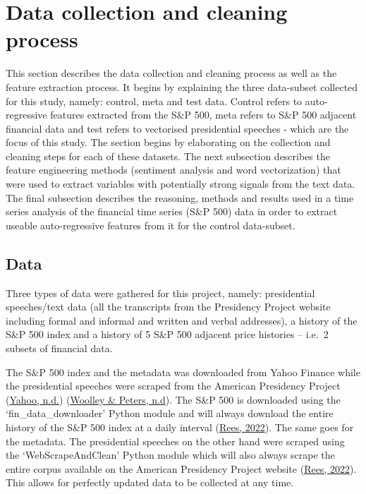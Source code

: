 \documentclass[11pt,preprint, authoryear]{elsarticle}
\numberwithin{equation}{section}
\numberwithin{figure}{section}
\numberwithin{table}{section}
\begin{document}
\hypertarget{data-collection-and-cleaning-process}{%
\section{Data collection and cleaning
process}\label{data-collection-and-cleaning-process}}

This section describes the data collection and cleaning process as well
as the feature extraction process. It begins by explaining the three
data-subset collected for this study, namely: control, meta and test
data. Control refers to auto-regressive features extracted from the S\&P
500, meta refers to S\&P 500 adjacent financial data and test refers to
vectorised presidential speeches - which are the focus of this study.
The section begins by elaborating on the collection and cleaning steps
for each of these datasets. The next subsection describes the feature
engineering methods (sentiment analysis and word vectorization) that
were used to extract variables with potentially strong signals from the
text data. The final subsection describes the reasoning, methods and
results used in a time series analysis of the financial time series
(S\&P 500) data in order to extract useable auto-regressive features
from it for the control data-subset.

\hypertarget{data-1}{%
\subsection{Data}\label{data-1}}

Three types of data were gathered for this project, namely: presidential
speeches/text data (all the transcripts from the Presidency Project
website including formal and informal and written and verbal addresses),
a history of the S\&P 500 index and a history of 5 S\&P 500 adjacent
price histories -- i.e.~2 subsets of financial data.

The S\&P 500 index and the metadata was downloaded from Yahoo Finance
while the presidential speeches were scraped from the American
Presidency Project (\protect\hyperlink{ref-yahooSP500}{Yahoo, n.d.})
(\protect\hyperlink{ref-americanPresProj1}{Woolley \& Peters, n.d}). The
S\&P 500 is downloaded using the `fin\_data\_downloader' Python module
and will always download the entire history of the S\&P 500 index at a
daily interval (\protect\hyperlink{ref-rees2022mastersgithub}{Rees,
2022}). The same goes for the metadata. The presidential speeches on the
other hand were scraped using the `WebScrapeAndClean' Python module
which will also always scrape the entire corpus available on the
American Presidency Project website
(\protect\hyperlink{ref-rees2022mastersgithub}{Rees, 2022}). This allows
for perfectly updated data to be collected at any time.
\end{document}
